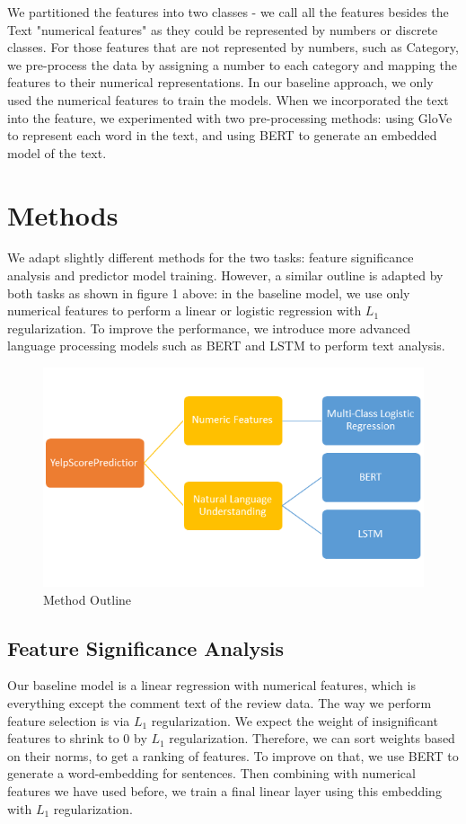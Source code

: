\documentclass{article}
\begin{document}
We partitioned the features into two classes - we call all the features besides the Text "numerical features" as they could be represented by numbers or discrete classes. For those features that are not represented by numbers, such as Category, we pre-process the data by assigning a number to each category and mapping the features to their numerical representations. In our baseline approach, we only used the numerical features to train the models. When we incorporated the text into the feature, we experimented with two pre-processing methods: using GloVe to represent each word in the text, and using BERT to generate an embedded model of the text. 

\section{Methods}
We adapt slightly different methods for the two tasks: feature significance analysis and predictor model training. However, a similar outline is adapted by both tasks as shown in figure 1 above: in the baseline model, we use only numerical features to perform a linear or logistic regression with $L_1$ regularization. To improve the performance, we introduce more advanced language processing models such as BERT and LSTM to perform text analysis. \\

\begin{figure}
\label{fig1}
\begin{center}
\includegraphics[scale=0.5]{approach_outline}
\caption{Method Outline}
\end{center}

\end{figure}


\subsection{Feature Significance Analysis}
Our baseline model is a linear regression with numerical features, which is everything except the comment text of the review data. The way we perform feature selection is via $L_1$ regularization. We expect the weight of insignificant features to shrink to 0 by $L_1$ regularization. Therefore, we can sort weights based on their norms, to get a ranking of features. To improve on that, we use BERT to generate a word-embedding for sentences. Then combining with numerical features we have used before, we train a final linear layer using this embedding with $L_1$ regularization.
\end{document}
